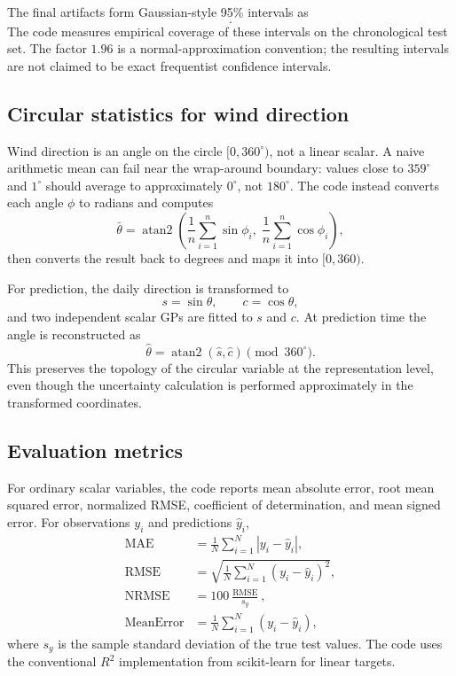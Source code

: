 \documentclass[11pt,a4paper]{article}
\begin{document}
The final artifacts form Gaussian-style 95\% intervals as
\begin{equation}
 [\mu_* - 1.96\,\sigma_*,\; \mu_* + 1.96\,\sigma_*].
\end{equation}
The code measures empirical coverage of these intervals on the chronological test set. The factor $1.96$ is a normal-approximation convention; the resulting intervals are not claimed to be exact frequentist confidence intervals.

\subsection{Circular statistics for wind direction}
Wind direction is an angle on the circle $[0,360^\circ)$, not a linear scalar. A naive arithmetic mean can fail near the wrap-around boundary: values close to $359^\circ$ and $1^\circ$ should average to approximately $0^\circ$, not $180^\circ$. The code instead converts each angle $\phi$ to radians and computes
\begin{equation}
 \bar{\theta} = \operatorname{atan2}\!\left(\frac{1}{n}\sum_{i=1}^{n}\sin\phi_i,\;\frac{1}{n}\sum_{i=1}^{n}\cos\phi_i\right),
\end{equation}
then converts the result back to degrees and maps it into $[0,360)$.

For prediction, the daily direction is transformed to
\begin{equation}
 s = \sin\theta,\qquad c = \cos\theta,
\end{equation}
and two independent scalar GPs are fitted to $s$ and $c$. At prediction time the angle is reconstructed as
\begin{equation}
 \hat{\theta}=\operatorname{atan2}(\hat{s},\hat{c})\pmod{360^\circ}.
\end{equation}
This preserves the topology of the circular variable at the representation level, even though the uncertainty calculation is performed approximately in the transformed coordinates.

\subsection{Evaluation metrics}
For ordinary scalar variables, the code reports mean absolute error, root mean squared error, normalized RMSE, coefficient of determination, and mean signed error. For observations $y_i$ and predictions $\hat y_i$,
\begin{align}
 \operatorname{MAE} &= \frac{1}{N}\sum_{i=1}^{N}|y_i-\hat y_i|,\\
 \operatorname{RMSE} &= \sqrt{\frac{1}{N}\sum_{i=1}^{N}(y_i-\hat y_i)^2},\\
 \operatorname{NRMSE} &= 100\frac{\operatorname{RMSE}}{s_y},\\
 \operatorname{MeanError} &= \frac{1}{N}\sum_{i=1}^{N}(y_i-\hat y_i),
\end{align}
where $s_y$ is the sample standard deviation of the true test values. The code uses the conventional $R^2$ implementation from scikit-learn for linear targets.
\end{document}
